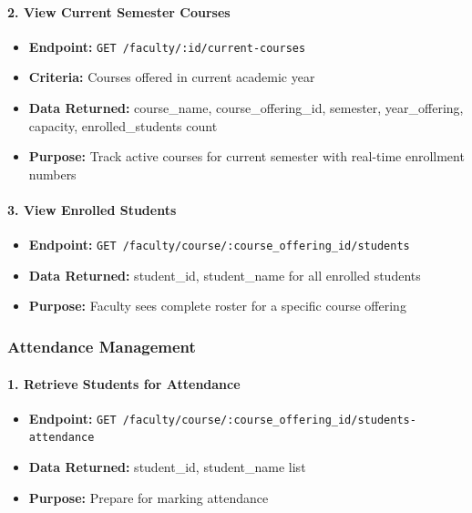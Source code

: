 \documentclass[12pt]{article}
\begin{document}
\paragraph{2. View Current Semester Courses}
\begin{itemize}
    \item \textbf{Endpoint:} \texttt{GET /faculty/:id/current-courses}
    \item \textbf{Criteria:} Courses offered in current academic year
    \item \textbf{Data Returned:} course\_name, course\_offering\_id, semester, year\_offering, capacity, enrolled\_students count
    \item \textbf{Purpose:} Track active courses for current semester with real-time enrollment numbers
\end{itemize}

\paragraph{3. View Enrolled Students}
\begin{itemize}
    \item \textbf{Endpoint:} \texttt{GET /faculty/course/:course\_offering\_id/students}
    \item \textbf{Data Returned:} student\_id, student\_name for all enrolled students
    \item \textbf{Purpose:} Faculty sees complete roster for a specific course offering
\end{itemize}

\subsubsection{Attendance Management}

\paragraph{1. Retrieve Students for Attendance}
\begin{itemize}
    \item \textbf{Endpoint:} \texttt{GET /faculty/course/:course\_offering\_id/students-attendance}
    \item \textbf{Data Returned:} student\_id, student\_name list
    \item \textbf{Purpose:} Prepare for marking attendance
\end{itemize}
\end{document}
